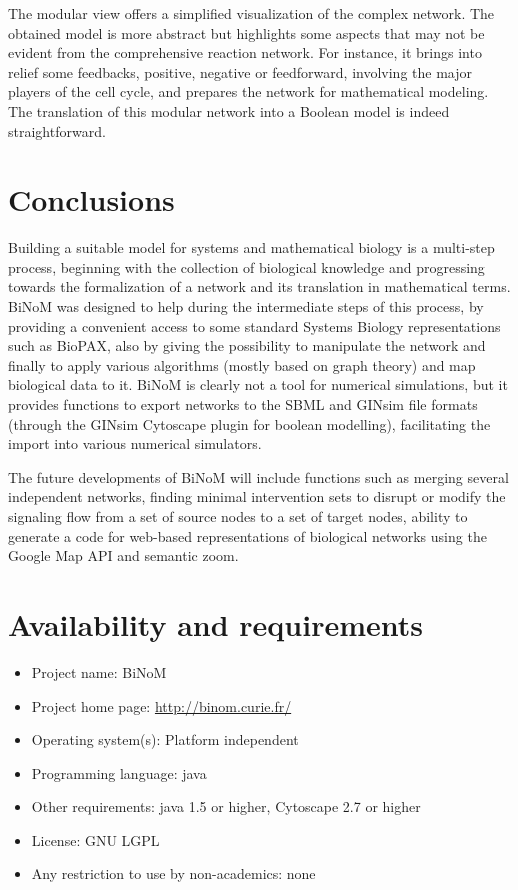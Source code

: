 \documentclass[10pt]{bmc_article}
\newenvironment{bmcformat}{\baselineskip20pt\sloppy\setboolean{publ}{false}}{\baselineskip20pt\sloppy}
\begin{document}
\begin{bmcformat}
The modular view offers a simplified visualization of the complex network. The
obtained model is more abstract but highlights some aspects that may not be
evident from the comprehensive reaction network. For instance, it brings into relief some
feedbacks, positive, negative or feedforward, involving the major players of the
cell cycle, and prepares the network for mathematical modeling. The translation
of this modular network into a Boolean model is indeed straightforward. 

\section*{Conclusions}

Building a suitable model for systems and mathematical biology is a multi-step
process, beginning with the collection of biological knowledge and progressing
towards the formalization of a network and its translation in mathematical
terms. BiNoM was designed to help during the intermediate steps of this process,
by providing a convenient access to some standard Systems Biology
representations such as BioPAX, also by giving the possibility to manipulate the
network and finally to apply various algorithms (mostly based on graph theory)
and map biological data to it. BiNoM is clearly not a tool for numerical
simulations, but it provides functions to export networks to the SBML and
GINsim file formats (through the GINsim Cytoscape plugin for boolean modelling), facilitating the
import into various numerical simulators.

The future developments of BiNoM will include functions such as merging several
independent networks, finding minimal intervention sets to disrupt or modify the
signaling flow from a set of source nodes to a set of target nodes, ability to
generate a code for web-based representations of biological networks using the
Google Map API and semantic zoom.


\section*{Availability and requirements}

\begin{itemize}
\item Project name: BiNoM
\item Project home page: \url{http://binom.curie.fr/}
\item Operating system(s): Platform independent
\item Programming language: java
\item Other requirements: java 1.5 or higher, Cytoscape 2.7 or higher
\item License: GNU LGPL
\item Any restriction to use by non-academics: none
\end{itemize}





\end{bmcformat}
\end{document}
